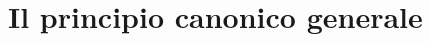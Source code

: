 \documentclass[10pt]{beamer}
\theoremstyle{definition}
\theoremstyle{plain}
\begin{document}
%	
%	
%	
%	
%
%

\section{Il principio canonico generale}
\end{document}
